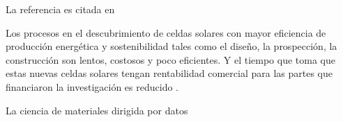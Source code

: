 La referencia es citada en \cite{wen2020}

Los procesos en el descubrimiento de celdas solares con mayor
eficiencia de producción energética y sostenibilidad tales como
el diseño, la prospección, la construcción son lentos, costosos y
poco eficientes. Y el tiempo que toma que estas nuevas celdas solares
tengan rentabilidad comercial para las partes que financiaron la investigación
es reducido \cite{eagar_bringing_1995}. 


La ciencia de materiales dirigida por datos 


